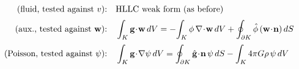 \documentclass[preview]{standalone}
\begin{document}
\begin{align*}
\special{dvisvgm:raw <g id='unique000'>}
            \begin{aligned}
            \text{(fluid, tested against } v\text{):} &\quad \text{HLLC weak form (as before)} \\[2pt]
            \text{(aux., tested against } \mathbf{w}\text{):} &\quad
            \int_K \mathbf{g}\!\cdot\!\mathbf{w}\,dV = -\!\int_K \phi\,\nabla\!\cdot\!\mathbf{w}\,dV
            + \oint_{\partial K} \hat\phi\,(\mathbf{w}\!\cdot\!\mathbf{n})\,dS \\[2pt]
            \text{(Poisson, tested against } \psi\text{):} &\quad
            \int_K \mathbf{g}\!\cdot\!\nabla\psi\,dV = \oint_{\partial K} \hat{\mathbf{g}}\!\cdot\!\mathbf{n}\,\psi\,dS
            - \int_K 4\pi G\rho\,\psi\,dV
            \end{aligned}
            \special{dvisvgm:raw </g>}
\end{align*}
\end{document}
